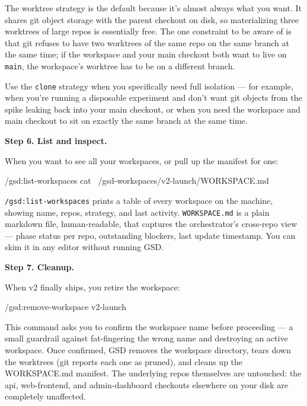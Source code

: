 \documentclass[11pt,letterpaper,openany]{book}
\begin{document}
\begin{gsdscenario}
\noindent
The worktree strategy is the default because it's almost always
what you want. It shares git object storage with the parent checkout
on disk, so materializing three worktrees of large repos is
essentially free. The one constraint to be aware of is that git
refuses to have two worktrees of the same repo on the same branch
at the same time; if the workspace and your main checkout both want
to live on \texttt{main}, the workspace's worktree has to be on a
different branch.

Use the \texttt{clone} strategy when you specifically need full
isolation --- for example, when you're running a disposable
experiment and don't want git objects from the spike leaking back
into your main checkout, or when you need the workspace and main
checkout to sit on exactly the same branch at the same time.

\textbf{Step 6. List and inspect.}

When you want to see all your workspaces, or pull up the manifest
for one:

\begin{gsdbash}
/gsd:list-workspaces
cat ~/gsd-workspaces/v2-launch/WORKSPACE.md
\end{gsdbash}

\noindent
\texttt{/gsd:list-workspaces} prints a table of every workspace on
the machine, showing name, repos, strategy, and last activity.
\texttt{WORKSPACE.md} is a plain markdown file, human-readable,
that captures the orchestrator's cross-repo view --- phase status
per repo, outstanding blockers, last update timestamp. You can
skim it in any editor without running GSD.

\textbf{Step 7. Cleanup.}

When v2 finally ships, you retire the workspace:

\begin{gsdbash}
/gsd:remove-workspace v2-launch
\end{gsdbash}

\noindent
This command asks you to confirm the workspace name before
proceeding --- a small guardrail against fat-fingering the wrong
name and destroying an active workspace. Once confirmed, GSD
removes the workspace directory, tears down the worktrees (git
reports each one as pruned), and cleans up the WORKSPACE.md
manifest. The underlying repos themselves are untouched: the api,
web-frontend, and admin-dashboard checkouts elsewhere on your
disk are completely unaffected.


\end{gsdscenario}
\end{document}
